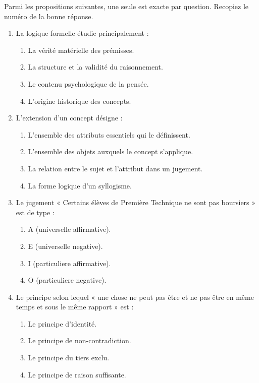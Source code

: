 \documentclass[11pt]{article}
\newcommand{\cle}[1]{{\popxbold\color{popdark}#1}}
\begin{document}
\begin{exercice}
Parmi les propositions suivantes, une seule est exacte par question. Recopiez le numéro de la bonne réponse.
\begin{enumerate}
    \item La logique formelle étudie principalement :
    \begin{enumerate}
        \item La vérité matérielle des prémisses.
        \item La structure et la validité du raisonnement.
        \item Le contenu psychologique de la pensée.
        \item L'origine historique des concepts.
    \end{enumerate}
    \item L'\cle{extension} d'un concept désigne :
    \begin{enumerate}
        \item L'ensemble des attributs essentiels qui le définissent.
        \item L'ensemble des objets auxquels le concept s'applique.
        \item La relation entre le sujet et l'attribut dans un jugement.
        \item La forme logique d'un syllogisme.
    \end{enumerate}
    \item Le jugement « Certains élèves de Première Technique ne sont pas boursiers » est de type :
    \begin{enumerate}
        \item A (universelle affirmative).
        \item E (universelle negative).
        \item I (particuliere affirmative).
        \item O (particuliere negative).
    \end{enumerate}
    \item Le principe selon lequel « une chose ne peut pas être et ne pas être en même temps et sous le même rapport » est :
    \begin{enumerate}
        \item Le principe d'identité.
        \item Le principe de non-contradiction.
        \item Le principe du tiers exclu.
        \item Le principe de raison suffisante.
    \end{enumerate}
\end{enumerate}
\end{exercice}
\end{document}
